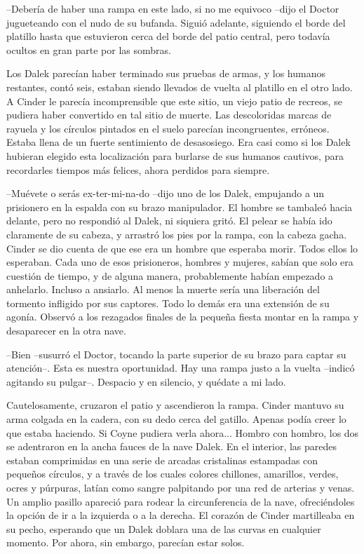 --Debería de haber una rampa en este lado, si no me equivoco --dijo el Doctor jugueteando con el nudo de su bufanda. Siguió adelante, siguiendo el borde del platillo hasta que estuvieron cerca del borde del patio central, pero todavía ocultos en gran parte por las sombras.

Los Dalek parecían haber terminado sus pruebas de armas, y los humanos restantes, contó seis, estaban siendo llevados de vuelta al platillo en el otro lado.
A Cinder le parecía incomprensible que este sitio, un viejo patio de recreos, se pudiera haber convertido en tal sitio de muerte. Las descoloridas marcas de rayuela y los círculos pintados en el suelo parecían incongruentes, erróneos. Estaba llena de un fuerte sentimiento de desasosiego. Era casi como si los Dalek hubieran elegido esta localización para burlarse de sus humanos cautivos, para recordarles tiempos más felices, ahora perdidos para siempre.

--Muévete o serás ex-ter-mi-na-do --dijo uno de los Dalek, empujando a un prisionero en la espalda con su brazo manipulador. El hombre se tambaleó hacia delante, pero no respondió al Dalek, ni siquiera gritó. El pelear se había ido claramente de su cabeza, y arrastró los pies por la rampa, con la cabeza gacha.
Cinder se dio cuenta de que ese era un hombre que esperaba morir. Todos ellos lo esperaban. Cada uno de esos prisioneros, hombres y mujeres, sabían que solo era cuestión de tiempo, y de alguna manera, probablemente habían empezado a anhelarlo. Incluso a ansiarlo. Al menos la muerte sería una liberación del tormento infligido por sus captores. Todo lo demás era una extensión de su agonía.
Observó a los rezagados finales de la pequeña fiesta montar en la rampa y desaparecer en la otra nave.

--Bien --susurró el Doctor, tocando la parte superior de su brazo para captar su atención--. Esta es nuestra oportunidad. Hay una rampa justo a la vuelta --indicó agitando su pulgar--. Despacio y en silencio, y quédate a mi lado.

Cautelosamente, cruzaron el patio y ascendieron la rampa. Cinder mantuvo su arma colgada en la cadera, con su dedo cerca del gatillo. Apenas podía creer lo que estaba haciendo. Si Coyne pudiera verla ahora...
Hombro con hombro, los dos se adentraron en la ancha fauces de la nave Dalek.
En el interior, las paredes estaban comprimidas en una serie de arcadas cristalinas estampadas con pequeños círculos, y a través de los cuales colores chillones, amarillos, verdes, ocres y púrpuras, latían como sangre palpitando por una red de arterias y venas.
Un amplio pasillo apareció para rodear la circunferencia de la nave, ofreciéndoles la opción de ir a la izquierda o a la derecha. El corazón de Cinder martilleaba en su pecho, esperando que un Dalek doblara una de las curvas en cualquier momento. Por ahora, sin embargo, parecían estar solos.

